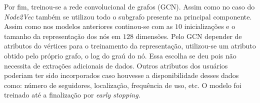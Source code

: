 Por fim, treinou-se a rede convolucional de grafos (GCN).
Assim como no caso do \textit{Node2Vec} também se utilizou todo o subgrafo
presente na principal componente.
Assim como nos modelos anteriores continou-se com as $10$ inicializações e o
tamanho da representação dos nós em $128$ dimensões.
Pelo GCN depender de atributos do vértices para o treinamento da representação,
utilizou-se um atributo obtido pelo próprio grafo, o log do graú do nó.
Essa escolha se deu pois não necessita de extrações adicionais de dados.
Outros atributos dos usuários poderiam ter sido incorporados caso houvesse a
disponibilidade desses dados como: número de seguidores, localização,
frequência de uso, etc.
O modelo foi treinado até a finalização por \textit{early stopping}.



